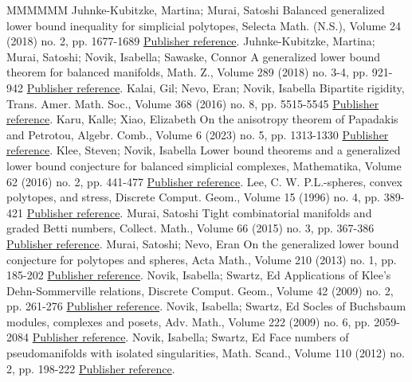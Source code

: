 \documentclass[11pt]{article}
\theoremstyle{definition}
\numberwithin{equation}{section}
\begin{document}
\begin{thebibliography}{MMMMMM}
 Juhnke-Kubitzke, Martina; Murai, Satoshi Balanced generalized lower bound inequality for simplicial polytopes, Selecta Math. (N.S.), Volume 24 (2018) no. 2, pp. 1677-1689 \href{https://alco.centre-mersenne.org/articles/10.5802/alco.419/#JM}{Publisher reference}.
 Juhnke-Kubitzke, Martina; Murai, Satoshi; Novik, Isabella; Sawaske, Connor A generalized lower bound theorem for balanced manifolds, Math. Z., Volume 289 (2018) no. 3-4, pp. 921-942 \href{https://alco.centre-mersenne.org/articles/10.5802/alco.419/#JMNS}{Publisher reference}.
 Kalai, Gil; Nevo, Eran; Novik, Isabella Bipartite rigidity, Trans. Amer. Math. Soc., Volume 368 (2016) no. 8, pp. 5515-5545 \href{https://alco.centre-mersenne.org/articles/10.5802/alco.419/#KNN}{Publisher reference}.
 Karu, Kalle; Xiao, Elizabeth On the anisotropy theorem of Papadakis and Petrotou, Algebr. Comb., Volume 6 (2023) no. 5, pp. 1313-1330 \href{https://alco.centre-mersenne.org/articles/10.5802/alco.419/#KX}{Publisher reference}.
 Klee, Steven; Novik, Isabella Lower bound theorems and a generalized lower bound conjecture for balanced simplicial complexes, Mathematika, Volume 62 (2016) no. 2, pp. 441-477 \href{https://alco.centre-mersenne.org/articles/10.5802/alco.419/#KN}{Publisher reference}.
 Lee, C. W. P.L.-spheres, convex polytopes, and stress, Discrete Comput. Geom., Volume 15 (1996) no. 4, pp. 389-421 \href{https://alco.centre-mersenne.org/articles/10.5802/alco.419/#Lee}{Publisher reference}.
 Murai, Satoshi Tight combinatorial manifolds and graded Betti numbers, Collect. Math., Volume 66 (2015) no. 3, pp. 367-386 \href{https://alco.centre-mersenne.org/articles/10.5802/alco.419/#Mu}{Publisher reference}.
 Murai, Satoshi; Nevo, Eran On the generalized lower bound conjecture for polytopes and spheres, Acta Math., Volume 210 (2013) no. 1, pp. 185-202 \href{https://alco.centre-mersenne.org/articles/10.5802/alco.419/#MN}{Publisher reference}.
 Novik, Isabella; Swartz, Ed Applications of Klee’s Dehn-Sommerville relations, Discrete Comput. Geom., Volume 42 (2009) no. 2, pp. 261-276 \href{https://alco.centre-mersenne.org/articles/10.5802/alco.419/#NS}{Publisher reference}.
 Novik, Isabella; Swartz, Ed Socles of Buchsbaum modules, complexes and posets, Adv. Math., Volume 222 (2009) no. 6, pp. 2059-2084 \href{https://alco.centre-mersenne.org/articles/10.5802/alco.419/#NS09}{Publisher reference}.
 Novik, Isabella; Swartz, Ed Face numbers of pseudomanifolds with isolated singularities, Math. Scand., Volume 110 (2012) no. 2, pp. 198-222 \href{https://alco.centre-mersenne.org/articles/10.5802/alco.419/#NS12}{Publisher reference}.

\end{thebibliography}
\end{document}
